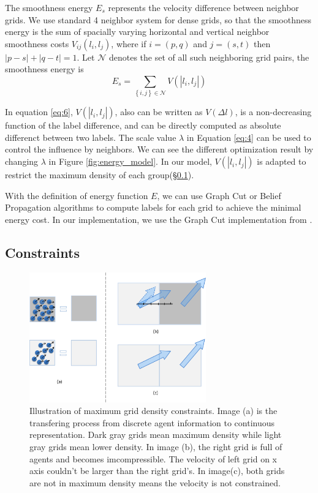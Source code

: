 \documentclass{egpubl}
\begin{document}
The smoothness energy $E_s$ represents the velocity difference between neighbor grids. We use standard 4 neighbor system for dense grids, so that the smoothness energy is the sum of spacially varying horizontal and vertical neighbor smoothness costs $V_{ij}(l_i,l_j)$, where if $i=(p,q)$ and $j=(s,t)$ then $\left|p-s\right| + \left|q-t\right| = 1$. Let $\mathcal{N}$ denotes the set of all such neighboring grid pairs, the smoothness energy is
\begin{equation}
\label{eq:6}
E_s = \sum\limits_{\left\{ {i,j} \right\} \in \mathcal{N}} V(\left|l_i,l_j\right|)
\end{equation}

In equation \ref{eq:6}, $V(\left|l_i,l_j\right|)$, also can be written as $V(\Delta l)$, is a non-decreasing function of the label difference, and can be directly computed as absolute differenct between two labels. The scale value $\lambda$ in Equation \ref{eq:4} can be used to control the influence by neighbors. We can see the different optimization result by changing $\lambda$ in Figure \ref{fig:energy_model}. In our model, $V(\left|l_i,l_j\right|)$ is adapted to restrict the maximum density of each group(\S\ref{section:3.3}).

With the definition of energy function $E$, we can use Graph Cut or Belief Propagation algorithms to compute labels for each grid to achieve the minimal energy cost. In our implementation, we use the Graph Cut implementation from \cite{Boykov:2001,Boykov:2004,Kolmogorov:2004}.

\subsection{Constraints}
\label{section:3.3}

\begin{figure}
  \centering
  \includegraphics[width=3in]{images/fig_inter_grid_constraints}
  \caption{Illustration of maximum grid density constraints. Image (a) is the transfering process from discrete agent information to continuous representation. Dark gray grids mean maximum density while light gray grids mean lower density. In image (b), the right grid is full of agents and becomes imcompressible. The velocity of left grid on x axis couldn't be larger than the right grid's. In image(c), both grids are not in maximum density means the velocity is not constrained.}
  \label{figure:grid_constraints}
\end{figure}
\end{document}
